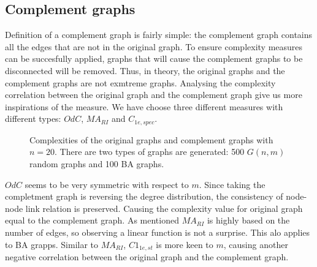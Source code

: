 \documentclass[12pt]{article}
\begin{document}
{\subsection{Complement graphs}
Definition of a complement graph is fairly simple: the complement graph contains all the edges that are not in the original graph. To ensure complexity measures can be succesfully applied, graphs that will cause the complement graphs to be disconnected will be removed. Thus, in theory, the original graphs and the complement graphs are not exmtreme graphs. Analysing the complexity correlation between the original graph and the complement graph give us more inspirations of the measure. We have choose three different measures with different types: $OdC$, $MA_{RI}$ and $C_{1e,spec}$.
\begin{figure}[h!]
    \caption{Complexities of the original graphs and complement graphs with $n=20$. There are two types of graphs are generated: 500 $G(n,m)$ random graphs and 100 BA graphs.}
    \label{fig:complement}
\end{figure}
\noindent
$OdC$ seems to be very symmetric with respect to $m$. Since taking the completment graph is reversing the degree distribution, the consistency of node-node link relation is preserved. Causing the complexity value for original graph equal to the complement graph. As mentioned $MA_{RI}$ is highly based on the number of edges, so observing a linear function is not a surprise. This alo applies to BA grapps. Similar to $MA_{RI}$, $C1_{1e,st}$ is more keen to $m$, causing another negative correlation between the original graph and the complement graph.\\


}
\end{document}
